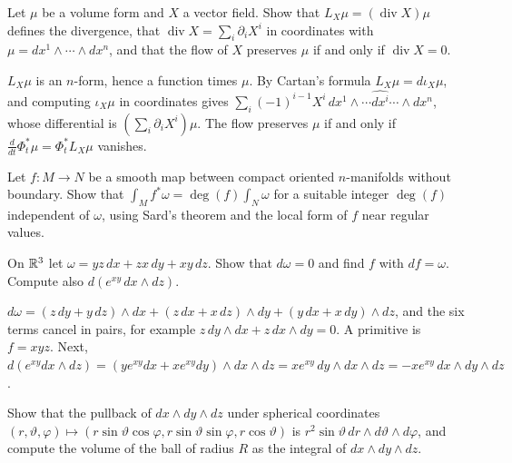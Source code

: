\begin{exercise}\label{differential-forms:exercise-lie-derivative-volume}
Let $\mu$ be a volume form and $X$ a vector field. Show that $L_X\mu = (\operatorname{div}X)\mu$ defines the divergence, that $\operatorname{div}X = \sum_i\partial_iX^i$ in coordinates with
$\mu = dx^1 \wedge \cdots \wedge dx^n$, and that the flow of $X$ preserves $\mu$ if and only if $\operatorname{div}X = 0$.
\end{exercise}

\begin{solution}
$L_X\mu$ is an $n$-form, hence a function times $\mu$. By Cartan's formula $L_X\mu = d\iota_X\mu$, and computing $\iota_X\mu$ in coordinates gives $\sum_i(-1)^{i-1}X^i\,dx^1 \wedge \cdots \widehat{dx^i} \cdots \wedge dx^n$,
whose differential is $(\sum_i\partial_iX^i)\mu$. The flow preserves $\mu$ if and only if $\frac{d}{dt}\Phi_t^*\mu = \Phi_t^*L_X\mu$ vanishes.
\end{solution}

\begin{exercise}\label{differential-forms:exercise-stokes-degree}
Let $f \colon M \to N$ be a smooth map between compact oriented $n$-manifolds without boundary. Show that $\int_Mf^*\omega = \deg(f)\int_N\omega$ for a suitable integer $\deg(f)$ independent of $\omega$, using
Sard's theorem and the local form of $f$ near regular values.
\end{exercise}

\begin{exercise}\label{differential-forms:exercise-exact-primitive}
On $\mathbb{R}^3$ let $\omega = yz\,dx + zx\,dy + xy\,dz$. Show that $d\omega = 0$ and find $f$ with $df = \omega$. Compute also $d(e^{xy}\,dx \wedge dz)$.
\end{exercise}

\begin{solution}
$d\omega = (z\,dy + y\,dz) \wedge dx + (z\,dx + x\,dz) \wedge dy + (y\,dx + x\,dy) \wedge dz$, and the six terms cancel in pairs, for example $z\,dy \wedge dx + z\,dx \wedge dy = 0$. A primitive is
$f = xyz$. Next, $d(e^{xy}dx \wedge dz) = (ye^{xy}dx + xe^{xy}dy) \wedge dx \wedge dz = xe^{xy}\,dy \wedge dx \wedge dz = -xe^{xy}\,dx \wedge dy \wedge dz$.
\end{solution}

\begin{exercise}\label{differential-forms:exercise-spherical-volume}
Show that the pullback of $dx \wedge dy \wedge dz$ under spherical coordinates $(r, \vartheta, \varphi) \mapsto (r\sin\vartheta\cos\varphi, r\sin\vartheta\sin\varphi, r\cos\vartheta)$ is
$r^2\sin\vartheta\,dr \wedge d\vartheta \wedge d\varphi$, and compute the volume of the ball of radius $R$ as the integral of $dx \wedge dy \wedge dz$.
\end{exercise}

